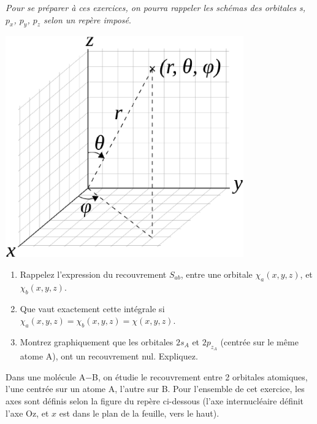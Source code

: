 

\textit{Pour se pr\'eparer \`a ces exercices, on pourra rappeler les sch\'emas des orbitales s, $p_x$, $p_y$, $p_z$ selon un rep\`ere impos\'e}.

\begin{center}
\includegraphics[height=9.5cm]{figure/spheriques_ok.eps}\\
\end{center}

\begin{enumerate}[\bf 1)]
\item   Rappelez l'expression du recouvrement $S_{ab}$, entre une orbitale $ \chi_a(x,y,z)$, et
$\chi_b(x,y,z)$.
\item  Que vaut exactement cette int\'egrale si $ \chi_a(x,y,z)=\chi_b(x,y,z)=\chi(x,y,z)$.
\item    Montrez graphiquement que les orbitales $2s_A$ et $2p_{z_{A}}$ (centr\'ee sur le m\^eme atome A), ont un recouvrement nul. Expliquez.
\end{enumerate} %
\label{exo_s}
Dans une mol\'ecule A$-$B, on \'etudie le recouvrement entre 2 orbitales atomiques, l'une centr\'ee sur un atome A, l'autre sur  B. Pour l'ensemble de cet exercice, les axes sont d\'efinis selon la figure du rep\`ere ci-dessous (l'axe internucl\'eaire d\'efinit l'axe Oz, et $x$ est dans le plan de la feuille, vers le haut). 
\\

